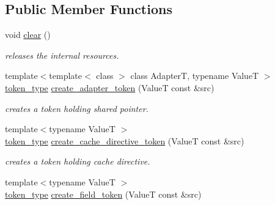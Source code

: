 \subsection*{Public Member Functions}
\begin{DoxyCompactItemize}
\item 
\hypertarget{classhryky_1_1http_1_1header_1_1_parser_a274efb7f946d3718efbfbc154750c278}{void \hyperlink{classhryky_1_1http_1_1header_1_1_parser_a274efb7f946d3718efbfbc154750c278}{clear} ()}\label{classhryky_1_1http_1_1header_1_1_parser_a274efb7f946d3718efbfbc154750c278}

\begin{DoxyCompactList}\small\item\em releases the internal resources. \end{DoxyCompactList}\item 
\hypertarget{classhryky_1_1http_1_1header_1_1_parser_a131ffc5be65b0aafa64241c87de5facd}{{\footnotesize template$<$template$<$ class $>$ class Adapter\-T, typename Value\-T $>$ }\\\hyperlink{classhryky_1_1_vector}{token\-\_\-type} \hyperlink{classhryky_1_1http_1_1header_1_1_parser_a131ffc5be65b0aafa64241c87de5facd}{create\-\_\-adapter\-\_\-token} (Value\-T const \&src)}\label{classhryky_1_1http_1_1header_1_1_parser_a131ffc5be65b0aafa64241c87de5facd}

\begin{DoxyCompactList}\small\item\em creates a token holding shared pointer. \end{DoxyCompactList}\item 
\hypertarget{classhryky_1_1http_1_1header_1_1_parser_ab563791ae22360bf7490fceb952d7601}{{\footnotesize template$<$typename Value\-T $>$ }\\\hyperlink{classhryky_1_1_vector}{token\-\_\-type} \hyperlink{classhryky_1_1http_1_1header_1_1_parser_ab563791ae22360bf7490fceb952d7601}{create\-\_\-cache\-\_\-directive\-\_\-token} (Value\-T const \&src)}\label{classhryky_1_1http_1_1header_1_1_parser_ab563791ae22360bf7490fceb952d7601}

\begin{DoxyCompactList}\small\item\em creates a token holding cache directive. \end{DoxyCompactList}\item 
\hypertarget{classhryky_1_1http_1_1header_1_1_parser_a1c184592556a67601aa3d6195a746dfb}{{\footnotesize template$<$typename Value\-T $>$ }\\\hyperlink{classhryky_1_1_vector}{token\-\_\-type} \hyperlink{classhryky_1_1http_1_1header_1_1_parser_a1c184592556a67601aa3d6195a746dfb}{create\-\_\-field\-\_\-token} (Value\-T const \&src)}\label{classhryky_1_1http_1_1header_1_1_parser_a1c184592556a67601aa3d6195a746dfb}


\end{DoxyCompactItemize}
